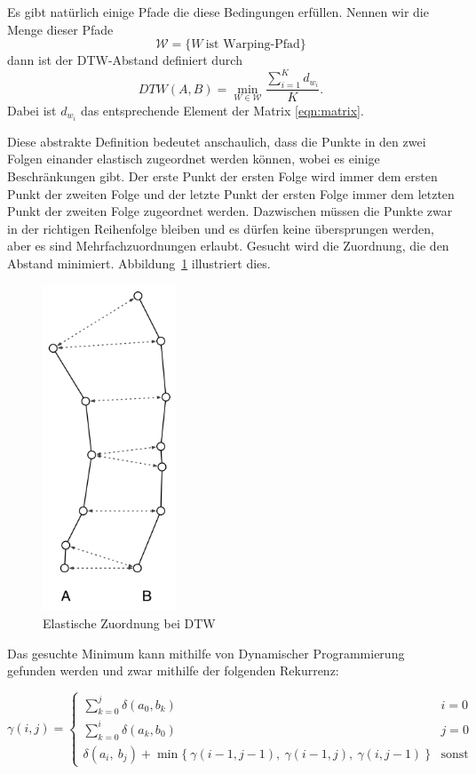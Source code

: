 Es gibt natürlich einige Pfade die diese Bedingungen erfüllen. Nennen wir die Menge dieser Pfade
\[ \mathcal{W}=\{W~\text{ist Warping-Pfad}\} \]
dann ist der DTW-Abstand definiert durch
\begin{equation}
  \label{eqn:dtw}
  DTW(A,B) = \min_{W \in \mathcal{W}}{\frac{\sum_{i=1}^K d_{w_i}}{K}} .
\end{equation}
Dabei ist \( d_{w_i} \) das entsprechende Element der Matrix \ref{eqn:matrix}.

Diese abstrakte Definition bedeutet anschaulich, dass die Punkte in den zwei Folgen einander elastisch zugeordnet werden können, wobei es einige Beschränkungen gibt. Der erste Punkt der ersten Folge wird immer dem ersten Punkt der zweiten Folge und der letzte Punkt der ersten Folge immer dem letzten Punkt der zweiten Folge zugeordnet werden. Dazwischen müssen die Punkte zwar in der richtigen Reihenfolge bleiben und es dürfen keine übersprungen werden, aber es sind Mehrfachzuordnungen erlaubt. Gesucht wird die Zuordnung, die den Abstand minimiert. Abbildung~\ref{fig:dtw} illustriert dies.

\begin{figure}
  \centering \includegraphics[width=4cm]{figures/dtw.png}
  \caption{Elastische Zuordnung bei DTW}
  \label{fig:dtw}
\end{figure}

Das gesuchte Minimum kann mithilfe von Dynamischer Programmierung \cite[S.323ff.]{algorithms} gefunden werden und zwar mithilfe der folgenden Rekurrenz:

\begin{equation}
  \label{eqn:dp}
  \gamma(i,j) =
  \begin{cases}
    \sum_{k=0}^j \delta(a_0, b_k) & i = 0 \\
    \sum_{k=0}^i \delta(a_k, b_0) & j = 0 \\
    \delta(a_i,~b_j) + \min\{~\gamma(i-1,j-1),~\gamma(i-1,j),~\gamma(i,j-1)~\} & \text{sonst}
  \end{cases}
\end{equation}

